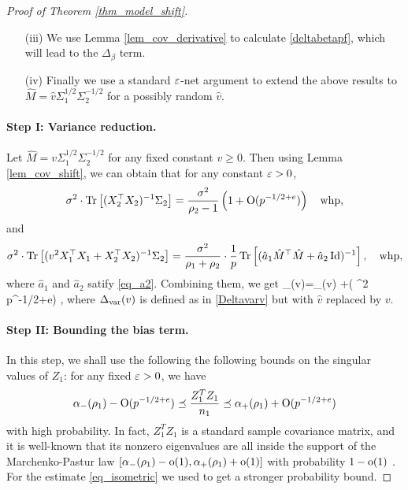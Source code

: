 \begin{proof}[Proof of Theorem \ref{thm_model_shift}]
\begin{itemize}
\item[(iii)] We use Lemma \ref{lem_cov_derivative} to calculate \eqref{deltabetapf}, which will lead to the $\Delta_{\beta}$ term.

\item[(iv)] Finally we use a standard ${\varepsilon}$-net argument to extend the above results to $\hat M= \hat v\Sigma_1^{1/2}\Sigma_2^{-1/2}$ for a possibly random $\hat v$.
\end{itemize}


\paragraph{Step I: Variance reduction.} Let $\hat M= v\Sigma_1^{1/2}\Sigma_2^{-1/2}$ for any fixed constant $v\ge 0$. Then using Lemma \ref{lem_cov_shift}, we can obtain that for any constant ${\varepsilon}>0$, 
$$  \sigma^2 \cdot \operatorname{Tr}\left[(X_2^{\top}X_2)^{-1}\Sigma_2\right] = \frac{\sigma^2}{\rho_2-1}\left( 1+ \operatorname{O}(p^{-1/2+e})\right) \quad \text{whp},$$
and 
$$ \sigma^2 \cdot \operatorname{Tr}\left[( {v}^2 X_1^{\top}X_1 + X_2^{\top}X_2)^{-1} \Sigma_2\right] =   \frac {\sigma^2} {\rho_1 + \rho_2}\cdot \frac1p \operatorname{Tr}\left[(\hat a_1 \hat M^{\top}\hat M + \hat a_2\operatorname{Id})^{-1}\right] ,\quad \text{whp},$$
where $\hat a_1$ and $\hat a_2$ satify \eqref{eq_a2}. Combining them, we get 
\be\label{deltavaral-} \delta_{\vari}(v)=\Delta_{\vari}(v) +\OO( \sigma^2 p^{-1/2+e}) \quad {},
\ee 
where $\Delta_{\text{var}}(v)$ is defined as in \eqref{Deltavarv} but with $\hat v$ replaced by $v$.



\paragraph{Step II: Bounding the bias term.}
In this step, we shall use the following the following bounds on the singular values of $Z_1$: for any fixed ${\varepsilon}>0$, we have
\begin{align}
\alpha_-(\rho_1) - \operatorname{O}(p^{-1/2+e})  \preceq \frac{Z_1^T Z_1}{n_1}  \preceq   \alpha_+(\rho_1) + \operatorname{O}(p^{-1/2+e})   \label{eq_isometric}
\end{align}
with high probability. In fact, $Z_1^TZ_1$ is a standard sample covariance matrix, and it is well-known that its nonzero eigenvalues are all inside the support of the Marchenko-Pastur law $[\alpha_-(\rho_1)-\operatorname{o}(1) ,\alpha_+(\rho_1)+\operatorname{o}(1)]$ with probability $1-\operatorname{o}(1)$ \cite{No_outside}. For the estimate \eqref{eq_isometric} we used \cite[Theorem 2.10]{isotropic} to get a stronger probability bound.



\end{proof}
